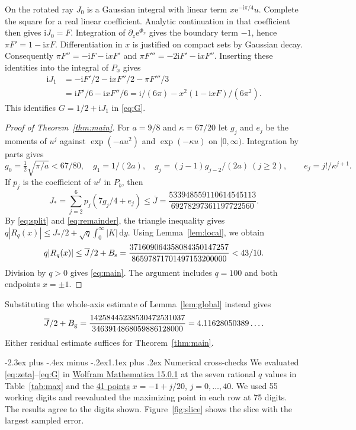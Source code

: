 \documentclass[11pt,a4paper]{article}
\makeatletter
\newcommand{\dd}{\,\mathrm d}
\newcommand{\ii}{\mathrm i}
\newcommand{\e}{\mathrm e}
\renewcommand\section{\@startsection{section}{1}{\z@}
  {-2.3ex plus -.4ex minus -.2ex}{1.1ex plus .2ex}
  {\normalfont\large\bfseries\centering}}
\DeclareRobustCommand{\suppfile}[2]{\href{https://github.com/tiagocampinasilva/alternating-hurwitz-zeta/blob/v1.0.0/#1}{#2}}
\makeatother
\begin{document}
On the rotated ray $J_0$ is a Gaussian integral with linear term
$x\e^{-\ii\pi/4}u$. Complete the square for a real linear coefficient. Analytic continuation
in that coefficient then gives $\ii J_0=F$.
Integration of $\partial_z\e^{\Phi_x}$ gives the boundary term $-1$,
hence $\pi F'=1-\ii xF$. Differentiation in $x$ is justified on compact
sets by Gaussian decay. Consequently $\pi F''=-\ii F-\ii xF'$ and
$\pi F'''=-2\ii F'-\ii xF''$. Inserting these identities into the
integral of $P_x$ gives
\begin{align*}
 \ii J_1&=-\ii F'/2-\ii xF''/2-\pi F'''/3\\
 &=\ii F'/6-\ii xF''/6
 =\ii/(6\pi)-x^2(1-\ii xF)/(6\pi^2).
\end{align*}
This identifies $G=1/2+\ii J_1$ in \eqref{eq:G}.

\begin{proof}[Proof of Theorem~\ref{thm:main}]
For $a=9/8$ and $\kappa=67/20$ let $g_j$ and $e_j$ be the moments of
$u^j$ against $\exp(-au^2)$ and $\exp(-\kappa u)$ on $[0,\infty)$.
Integration by parts gives
\[
 g_0=\tfrac12\sqrt{\pi/a}<67/80,\quad
 g_1=1/(2a),\quad g_j=(j-1)g_{j-2}/(2a)\ (j\ge2),
 \qquad e_j=j!/\kappa^{j+1}.
\]
If $p_j$ is the coefficient of $u^j$ in $P_b$, then
\[
 J_*=\sum_{j=2}^6 p_j(7g_j/4+e_j)
 \le \overline J=\frac{533948559110614545113}{69278297361197722560} .
\]
By \eqref{eq:split} and \eqref{eq:remainder}, the triangle inequality
gives $q|R_q(x)|\le J_*/2+\sqrt q\int_0^\infty|K|\dd y$. Using
Lemma~\ref{lem:local}, we obtain
\begin{equation}\label{eq:classicC}
 q|R_q(x)|\le\overline J/2+B_{\rm s}
 =\frac{371609064358084350147257}{86597871701497153200000}<43/10.
\end{equation}
Division by $q>0$ gives \eqref{eq:main}. The argument includes
$q=100$ and both endpoints $x=\pm1$.
\end{proof}

Substituting the whole-axis estimate of Lemma~\ref{lem:global} instead gives
\begin{equation}\label{eq:otherC}
 \overline J/2+B_{\rm g}=\frac{14258445238530472531037}{3463914868059886128000}=4.11628050389\ldots .
\end{equation}
Either residual estimate suffices for Theorem~\ref{thm:main}.

\section{Numerical cross-checks}\label{sec:numerics}
We evaluated \eqref{eq:zeta}--\eqref{eq:G} in \suppfile{Verification/verification.wl}{Wolfram Mathematica 15.0.1}
\cite{WolframMathematica} at the seven rational $q$ values in
Table~\ref{tab:max} and the \suppfile{Verification/verification_results.csv}{41 points} $x=-1+j/20$, $j=0,\ldots,40$.
We used 55 working digits and reevaluated the maximizing point in each row at 75 digits.
The results agree to the digits shown. Figure~\ref{fig:slice} shows the
slice with the largest sampled error.
\end{document}
